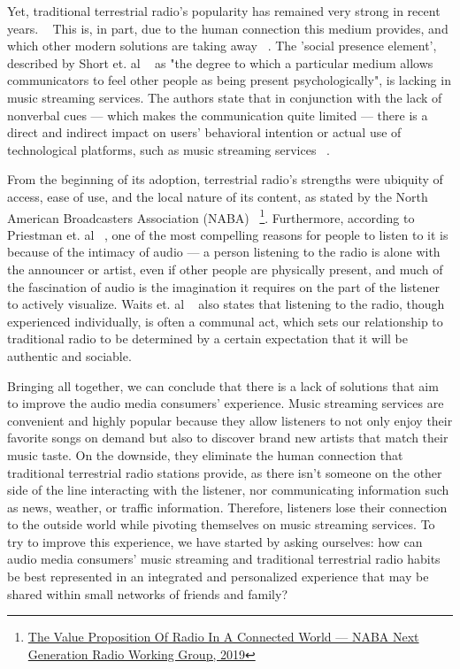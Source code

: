 Yet, traditional terrestrial radio's popularity has remained very strong in recent years. ~\cite{Albarran2007} This is, in part, due to the human connection this medium provides, and which other modern solutions are taking away ~\cite{Waits2007}. The 'social presence element', described by Short et. al ~\cite{JohnShortEderynWilliams1976} as "the degree to which a particular medium allows communicators to feel other people as being present psychologically", is lacking in music streaming services. The authors state that in conjunction with the lack of nonverbal cues —  which makes the communication quite limited — there is a direct and indirect impact on users’ behavioral intention or actual use of technological platforms, such as music streaming services ~\cite{Wang2014}.

From the beginning of its adoption, terrestrial radio's strengths were ubiquity of access, ease of use, and the local nature of its content, as stated by the North American Broadcasters Association (NABA) ~\footnote{\href{https://nabanet.com/wp-content/uploads/2019/03/NGR-WG-Value-Proposition-of-Radio-in-a-Connected-World-2019-03-15.pdf}{The Value Proposition Of Radio In A Connected World — NABA Next Generation Radio Working Group, 2019}}. Furthermore, according to Priestman et. al ~\cite{Priestman2005}, one of the most compelling reasons for people to listen to it is because of the intimacy of audio — a person listening to the radio is alone with the announcer or artist, even if other people are physically present, and much of the fascination of audio is the imagination it requires on the part of the listener to actively visualize. Waits et. al ~\cite{Waits2007} also states that listening to the radio, though experienced individually, is often a communal act, which sets our relationship to traditional radio to be determined by a certain expectation that it will be authentic and sociable.

Bringing all together, we can conclude that there is a lack of solutions that aim to improve the audio media consumers' experience. Music streaming services are convenient and highly popular because they allow listeners to not only enjoy their favorite songs on demand but also to discover brand new artists that match their music taste. On the downside, they eliminate the human connection that traditional terrestrial radio stations provide, as there isn't someone on the other side of the line interacting with the listener, nor communicating information such as news, weather, or traffic information. Therefore, listeners lose their connection to the outside world while pivoting themselves on music streaming services. To try to improve this experience, we have started by asking ourselves: how can audio media consumers' music streaming and traditional terrestrial radio habits be best represented in an integrated and personalized experience that may be shared within small networks of friends and family?

